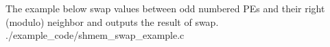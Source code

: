 \begin{apidefinition}


\begin{apiexamples}

\apicexample
    {The example below swap values between odd numbered \acp{PE} and their right
    (modulo) neighbor and outputs the result of swap.}
    {./example_code/shmem_swap_example.c}
    {}

\end{apiexamples}

\end{apidefinition}
